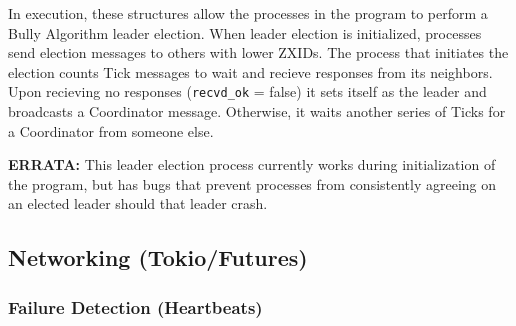 \documentclass{article}
\begin{document}
	In execution, these structures allow the processes in the program to perform a Bully Algorithm leader election. When leader election is initialized, processes send election messages to others with lower ZXIDs. The process that initiates the election counts Tick messages to wait and recieve responses from its neighbors. Upon recieving no responses (\verb|recvd_ok| = false) it sets itself as the leader and broadcasts a Coordinator message. Otherwise, it waits another series of Ticks for a Coordinator from someone else. 

	\textbf{ERRATA:} This leader election process currently works during initialization of the program, but has bugs that prevent processes from consistently agreeing on an elected leader should that leader crash. 


\subsection*{Networking (Tokio/Futures)}
\subsubsection*{Failure Detection (Heartbeats)}
\end{document}
